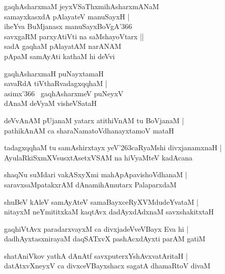 \documentclass[twoside,12pt,openright]{book}
\def\S{\char'263}
\newcounter{shloka}[chapter]
\begin{document}
\begin{shloka}%
gaqhAsharxmaM jeyxVSaThxmihAsharxmANaM \\
samayxkasxdA pAlayateV manuSayxH |\\
iheYva BuMjanasx manuSayxBoVgA\char'366 ~\\
savxgaRM parxyAtiVti na saMshayoVtarx ||\\
sadA gaqhaM pAlayatAM narANAM \\
pApaM samAyAti kathaM hi deVvi
\end{shloka}

\begin{shloka}%
gaqhAsharxmaH puNayxtamaH \\
savaRdA tiVthaRvadagxqqhaM |\\
asimx\char'366 ~gaqhAsharxmeV puNeyxV \\
dAnaM deVyaM visheVSataH 
\end{shloka}

\begin{shloka}%
deVvAnAM pUjanaM yatarx atithiVnAM tu BoVjanaM |\\
pathikAnAM ca sharaNamatoVdhanayxtamoV mataH 
\end{shloka}

\begin{shloka}%
tadagxqqhaM tu samAshirxtayx yeV\S caRyaMshi divxjanamxnaH |\\
AyulaRkiSxmXVsusxtAsetxVSAM na hiVyaMteV kadAcana 
\end{shloka}

\begin{shloka}%
shaqNu suMdari vakASxyXmi mahApApavishoVdhanaM |\\
saravxsaMpatakxrAM dAnamihAmutarx PalaparxdaM 
\end{shloka}

\begin{shloka}%
shuBeV kAleV samAyAteV samaBayxceRyXVMdudeYvataM |\\
nitayxM neYmititxkaM kaqtAvx dadAyxdAdxnaM savxshakitxtaH 
\end{shloka}

\begin{shloka}%
gaqhiVtAvx paradarxvayxM ca divxjadeVveVBayx Eva hi |\\
dadhAyxtasxnirayaM daqSATxvX pashAcxdAyxti parAM gatiM 
\end{shloka}

\begin{shloka}%
shatAniVkov yathA dAnAtf savxputerxYshAvxvatAritaH |\\
datAtxvXneyxV ca divxceVBayxshacx sagatA dhamaRtoV divaM 
\end{shloka}
\end{document}
